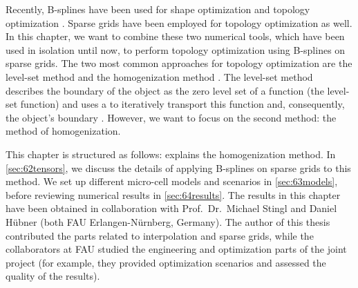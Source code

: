 Recently, B-splines have been used for
shape optimization \cite{Martin16Formoptimierung} and
topology optimization .
Sparse grids have been employed for
topology optimization \cite{Huebner14Mehrdimensionale} as well.
In this chapter, we want to combine these two numerical tools,
which have been used in isolation until now,
to perform topology optimization using B-splines on sparse grids.
The two most common approaches for topology optimization are
the level-set method and the homogenization method \cite{Allaire16Towards}.
The level-set method describes the boundary of the object
as the zero level set of a function (the level-set function)
and uses a \pde to iteratively transport this function and,
consequently, the object's boundary \cite{Allaire04Topology}.
However, we want to focus on the second method:
the method of homogenization.

This chapter is structured as follows:
 explains the homogenization method.
In \cref{sec:62tensors}, we discuss the details of applying B-splines on
sparse grids to this method.
We set up different micro-cell models and scenarios in \cref{sec:63models},
before reviewing numerical results in \cref{sec:64results}.
The results in this chapter have been obtained in collaboration with
Prof.\ Dr.\ Michael Stingl and Daniel Hübner
(both FAU Erlangen-Nürnberg, Germany).
The author of this thesis contributed the parts related to
interpolation and sparse grids, while the collaborators at FAU
studied the engineering and optimization parts of the joint project
(for example, they provided optimization scenarios and
assessed the quality of the results).






\cleardoublepage
